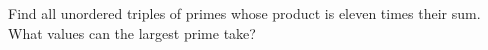 Find all unordered triples of primes whose product is eleven times their sum. What values can the largest prime take?
